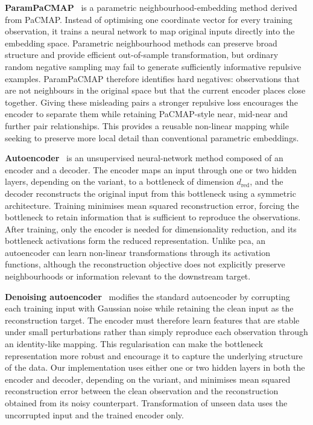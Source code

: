     \noindent \textbf{ParamPaCMAP}~\citep{HuaEtAl24} is a parametric neighbourhood-embedding method derived from PaCMAP. Instead of optimising one coordinate vector for every training observation, it trains a neural network to map original inputs directly into the embedding space. Parametric neighbourhood methods can preserve broad structure and provide efficient out-of-sample transformation, but ordinary random negative sampling may fail to generate sufficiently informative repulsive examples. ParamPaCMAP therefore identifies hard negatives: observations that are not neighbours in the original space but that the current encoder places close together. Giving these misleading pairs a stronger repulsive loss encourages the encoder to separate them while retaining PaCMAP-style near, mid-near and further pair relationships. This provides a reusable non-linear mapping while seeking to preserve more local detail than conventional parametric embeddings.

    \noindent \textbf{Autoencoder}~\citep{Ballard87} is an unsupervised neural-network method composed of an encoder and a decoder. The encoder maps an input through one or two hidden layers, depending on the variant, to a bottleneck of dimension $d_{\mathrm{red}}$, and the decoder reconstructs the original input from this bottleneck using a symmetric architecture. Training minimises mean squared reconstruction error, forcing the bottleneck to retain information that is sufficient to reproduce the observations. After training, only the encoder is needed for dimensionality reduction, and its bottleneck activations form the reduced representation. Unlike \gls{pca}, an autoencoder can learn non-linear transformations through its activation functions, although the reconstruction objective does not explicitly preserve neighbourhoods or information relevant to the downstream target.

    \noindent \textbf{Denoising autoencoder}~\citep{BenEtAl13} modifies the standard autoencoder by corrupting each training input with Gaussian noise while retaining the clean input as the reconstruction target. The encoder must therefore learn features that are stable under small perturbations rather than simply reproduce each observation through an identity-like mapping. This regularisation can make the bottleneck representation more robust and encourage it to capture the underlying structure of the data. Our implementation uses either one or two hidden layers in both the encoder and decoder, depending on the variant, and minimises mean squared reconstruction error between the clean observation and the reconstruction obtained from its noisy counterpart. Transformation of unseen data uses the uncorrupted input and the trained encoder only.

